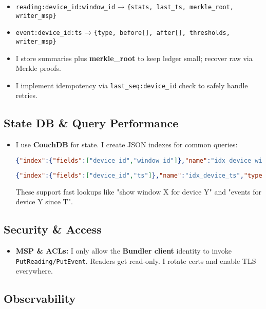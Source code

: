 \documentclass[12pt]{article}
\begin{document}
\begin{itemize}
\item \texttt{reading:device\_id:window\_id} → \texttt{\{stats, last\_ts, merkle\_root, writer\_msp\}}
\item \texttt{event:device\_id:ts} → \texttt{\{type, before[], after[], thresholds, writer\_msp\}}
\item I store summaries plus \textbf{merkle\_root} to keep ledger small; recover raw via Merkle proofs.
\item I implement idempotency via \texttt{last\_seq:device\_id} check to safely handle retries.
\end{itemize}

\subsection{State DB \& Query Performance}

\begin{itemize}
\item I use \textbf{CouchDB} for state. I create JSON indexes for common queries:
  \begin{lstlisting}[language=json, basicstyle=\footnotesize\ttfamily]
  {"index":{"fields":["device_id","window_id"]},"name":"idx_device_window","type":"json"}
  \end{lstlisting}
  \begin{lstlisting}[language=json, basicstyle=\footnotesize\ttfamily]
  {"index":{"fields":["device_id","ts"]},"name":"idx_device_ts","type":"json"}
  \end{lstlisting}
  These support fast lookups like "show window X for device Y" and "events for device Y since T".
\end{itemize}

\subsection{Security \& Access}

\begin{itemize}
\item \textbf{MSP \& ACLs:} I only allow the \textbf{Bundler client} identity to invoke \texttt{PutReading/PutEvent}. Readers get read-only. I rotate certs and enable TLS everywhere.
\end{itemize}

\subsection{Observability}
\end{document}

